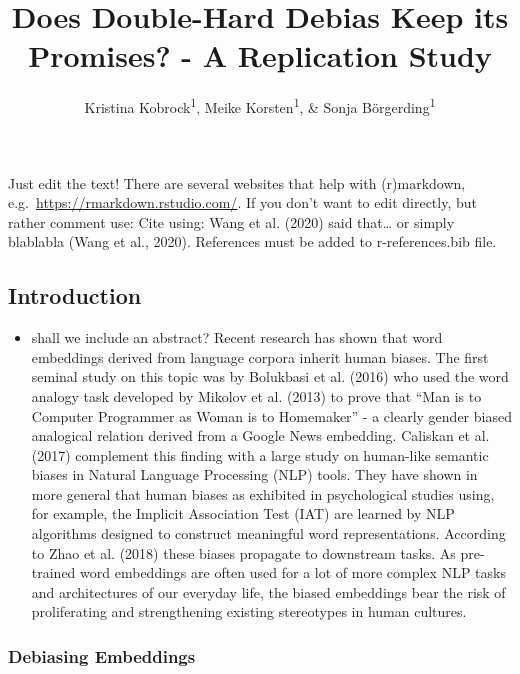 \documentclass[
  english,
  man,floatsintext]{apa6}
\title{Does Double-Hard Debias Keep its Promises? - A Replication Study}
\author{Kristina Kobrock\textsuperscript{1}, Meike Korsten\textsuperscript{1}, \& Sonja Börgerding\textsuperscript{1}}
\date{}
\affiliation{\vspace{0.5cm}\textsuperscript{1} University of Osnabrück}
\providecommand{\tightlist}{%
  \setlength{\itemsep}{0pt}\setlength{\parskip}{0pt}}
\begin{document}
\maketitle

Just edit the text! There are several websites that help with (r)markdown, e.g.~\url{https://rmarkdown.rstudio.com/}.
If you don't want to edit directly, but rather comment use:
Cite using: Wang et al. (2020) said that\ldots{} or simply blablabla (Wang et al., 2020). References must be added to r-references.bib file.

\hypertarget{introduction}{%
\subsection{Introduction}\label{introduction}}

\begin{itemize}
\tightlist
\item
  shall we include an abstract?
  Recent research has shown that word embeddings derived from language corpora inherit human biases. The first seminal study on this topic was by Bolukbasi et al. (2016) who used the word analogy task developed by Mikolov et al. (2013) to prove that ``Man is to Computer Programmer as Woman is to Homemaker'' - a clearly gender biased analogical relation derived from a Google News embedding. Caliskan et al. (2017) complement this finding with a large study on human-like semantic biases in Natural Language Processing (NLP) tools. They have shown in more general that human biases as exhibited in psychological studies using, for example, the Implicit Association Test (IAT) are learned by NLP algorithms designed to construct meaningful word representations. According to Zhao et al. (2018) these biases propagate to downstream tasks. As pre-trained word embeddings are often used for a lot of more complex NLP tasks and architectures of our everyday life, the biased embeddings bear the risk of proliferating and strengthening existing stereotypes in human cultures.
\end{itemize}

\hypertarget{debiasing-embeddings}{%
\subsubsection{Debiasing Embeddings}\label{debiasing-embeddings}}
\end{document}
